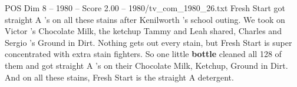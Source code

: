 \begin{textsample}{POS Dim 8 – 1980 – Score 2.00 – 1980/tv\_com\_1980\_26.txt}  \label{ex:f8_pos_042}
Fresh Start got straight A 's on all these stains after Kenilworth 's school outing.
We took on Victor 's Chocolate Milk, the ketchup Tammy and Leah shared, Charles and Sergio 's Ground in Dirt.
Nothing gets out every stain, but Fresh Start is super concentrated with extra stain fighters.
So one little \textbf{bottle} cleaned all 128 of them and got straight A 's on their Chocolate Milk, Ketchup, Ground in Dirt.
And on all these stains, Fresh Start is the straight A detergent.

\end{textsample}
